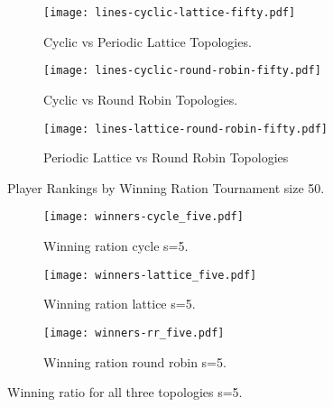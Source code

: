 \begin{figure}[H]
\centering
    \begin{subfigure}[t]{0.4\textwidth}
    \centering
        \texttt{[image: lines-cyclic-lattice-fifty.pdf]}
    \caption{Cyclic vs Periodic Lattice Topologies.}
    \end{subfigure}
\hfill
    \begin{subfigure}[t]{0.4\textwidth}\centering
    \centering
        \texttt{[image: lines-cyclic-round-robin-fifty.pdf]}
    \caption{Cyclic vs Round Robin Topologies.}
    \end{subfigure}
\hfill
    \begin{subfigure}[t]{0.4\textwidth}\centering
    \centering
        \texttt{[image: lines-lattice-round-robin-fifty.pdf]}
    \caption{Periodic Lattice vs Round
             Robin Topologies}
    \end{subfigure}
\caption{Player Rankings by Winning Ration Tournament size 50.}
\label{fig:winning-rankings-fifty}
\end{figure}


\begin{figure}[!hbtp]
\centering
    \begin{subfigure}[t]{1\textwidth}
    \centering
        \texttt{[image: winners-cycle\_five.pdf]}
    \caption{Winning ration cycle s=5.}
    \end{subfigure}
\hfill
    \begin{subfigure}[t]{1\textwidth}\centering
    \centering
        \texttt{[image: winners-lattice\_five.pdf]}
    \caption{Winning ration lattice s=5.}
    \end{subfigure}
\hfill
    \begin{subfigure}[t]{1\textwidth}\centering
    \centering
        \texttt{[image: winners-rr\_five.pdf]}
    \caption{Winning ration round robin s=5.}
    \end{subfigure}
\caption{Winning ratio for all three topologies s=5.}
\label{fig:winning-five}
\end{figure}

